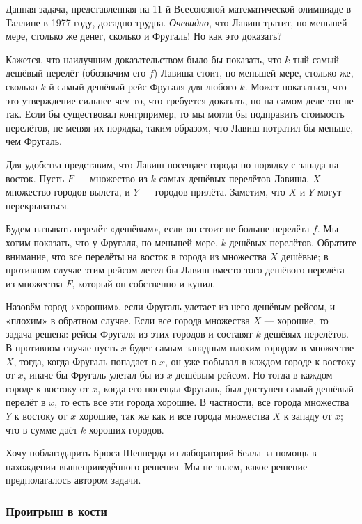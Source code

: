 Данная задача, представленная на 11-й Всесоюзной математической олимпиаде в Таллине в 1977 году, досадно трудна. %
\emph{Очевидно}, что Лавиш тратит, по меньшей мере, столько же денег, сколько и Фругаль!
Но как это доказать? %

\medskip

Кажется, что наилучшим доказательством было бы показать, что $k$-тый самый
дешёвый перелёт (обозначим его $f$) Лавиша стоит, по меньшей мере, столько же, сколько $k$-й самый дешёвый рейс Фругаля для любого $k$.
Может показаться, что это утверждение сильнее чем то, что требуется доказать, но на самом деле это не так.
Если бы существовал контрпример, то мы могли бы подправить стоимость перелётов, не меняя их порядка, таким образом, что Лавиш потратил бы меньше, чем Фругаль.

Для удобства представим, что Лавиш посещает города по порядку с запада на восток.
Пусть $F$ --- множество из $k$ самых дешёвых перелётов Лавиша, $X$ --- множество городов вылета, и $Y$ --- городов прилёта.
Заметим, что $X$ и $Y$ могут перекрываться.

Будем называть перелёт «дешёвым», если он стоит не больше перелёта $f$.
Мы хотим показать, что у Фругаля, по меньшей мере, $k$ дешёвых перелётов.
Обратите внимание, что все перелёты на восток в города из множества $X$ дешёвые; в противном случае этим рейсом летел бы Лавиш вместо того дешёвого перелёта из множества $F$, который он собственно и купил.

Назовём город «хорошим», если Фругаль улетает из него дешёвым рейсом, и «плохим» в обратном случае.
Если все города множества $X$ --- хорошие, то задача решена: рейсы Фругаля из этих городов и составят $k$ дешёвых перелётов.
В противном случае пусть $x$ будет самым западным плохим городом в множестве $X$, тогда, когда Фругаль попадает в $x$, он уже побывал в каждом городе к востоку от $x$, иначе бы Фругаль улетал бы из $x$ дешёвым рейсом.
Но тогда в каждом городе к востоку от $x$, когда его посещал Фругаль, был доступен самый дешёвый перелёт в $x$, то есть все эти города хорошие.
В частности, все города множества $Y$ к востоку от $x$ хорошие, так же как и все города множества $X$ к западу от $x$; что в сумме даёт $k$ хороших городов.
\heart

Хочу поблагодарить Брюса Шепперда %
из лабораторий Белла %
за помощь в нахождении вышеприведённого решения.
Мы не знаем, какое решение предполагалось автором задачи.

\subsubsection*{Проигрыш в кости}%

